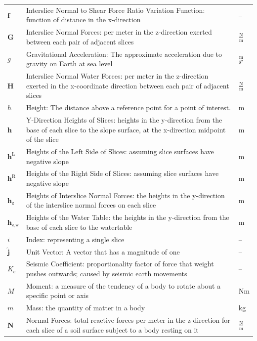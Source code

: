 \documentclass[12pt]{article}
\begin{document}
\begin{longtabu}{l X[l] l}
\\
$\mathbf{f}$ & Interslice Normal to Shear Force Ratio Variation Function: function of distance in the x-direction & --
\\
$\mathbf{G}$ & Interslice Normal Forces: per meter in the z-direction exerted between each pair of adjacent slices & $\frac{\text{N}}{\text{m}}$
\\
$g$ & Gravitational Acceleration: The approximate acceleration due to gravity on Earth at sea level & $\frac{\text{m}}{\text{s}^{2}}$
\\
$\mathbf{H}$ & Interslice Normal Water Forces: per meter in the z-direction exerted in the x-coordinate direction between each pair of adjacent slices & $\frac{\text{N}}{\text{m}}$
\\
$h$ & Height: The distance above a reference point for a point of interest. & m
\\
$\mathbf{h}$ & Y-Direction Heights of Slices: heights in the y-direction from the base of each slice to the slope surface, at the x-direction midpoint of the slice & m
\\
${\mathbf{h}^{\text{L}}}$ & Heights of the Left Side of Slices: assuming slice surfaces have negative slope & m
\\
${\mathbf{h}^{\text{R}}}$ & Heights of the Right Side of Slices: assuming slice surfaces have negative slope & m
\\
${\mathbf{h}_{\text{z}}}$ & Heights of Interslice Normal Forces: the heights in the y-direction of the interslice normal forces on each slice & m
\\
${\mathbf{h}_{\text{z,w}}}$ & Heights of the Water Table: the heights in the y-direction from the base of each slice to the watertable & m
\\
$i$ & Index: representing a single slice & --
\\
$\mathbf{\hat{j}}$ & Unit Vector: A vector that has a magnitude of one & --
\\
${K_{\text{c}}}$ & Seismic Coefficient: proportionality factor of force that weight pushes outwards; caused by seismic earth movements & --
\\
$M$ & Moment: a measure of the tendency of a body to rotate about a specific point or axis & Nm
\\
$m$ & Mass: the quantity of matter in a body & kg
\\
$\mathbf{N}$ & Normal Forces: total reactive forces per meter in the z-direction for each slice of a soil surface subject to a body resting on it & $\frac{\text{N}}{\text{m}}$

\end{longtabu}
\end{document}
